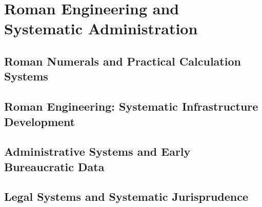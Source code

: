 
\chapter{Roman Engineering and Systematic Administration}

\section{Roman Numerals and Practical Calculation Systems}

\section{Roman Engineering: Systematic Infrastructure Development}

\section{Administrative Systems and Early Bureaucratic Data}

\section{Legal Systems and Systematic Jurisprudence}
